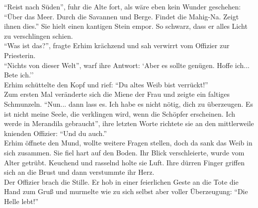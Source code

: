 ``Reist nach Süden'', fuhr die Alte fort, als wäre eben kein Wunder geschehen: ``Über das Meer. 
Durch die Savannen und Berge. Findet die Mahig-Na. Zeigt ihnen dies.'' Sie hielt einen kantigen 
Stein empor. So schwarz, dass er alles Licht zu verschlingen schien.\\
``Was ist das?'', fragte Erhim krächzend und sah verwirrt vom Offizier zur Priesterin.\\
``Nichts von dieser Welt'', warf ihre Antwort: `Aber es sollte genügen. Hoffe ich... Bete ich.''\\
Erhim schüttelte den Kopf und rief: ``Du altes Weib bist verrückt!''\\
Zum ersten Mal veränderte sich die Miene der Frau und zeigte ein faltiges Schmunzeln. ``Nun... 
dann lass es. Ich habe es nicht nötig, dich zu überzeugen. Es ist nicht meine Seele, die 
verklingen wird, wenn die Schöpfer erscheinen. Ich werde in Merandila gebraucht'', ihre letzten 
Worte richtete sie an den mittlerweile knienden Offizier: ``Und du auch.''\\
Erhim öffnete den Mund, wollte weitere Fragen stellen, doch da sank das Weib in sich zusammen. Sie 
fiel hart auf den Boden. Ihr Blick verschleierte, wurde vom Alter getrübt. Keuchend und rasselnd 
holte sie Luft. Ihre dürren Finger griffen sich an die Brust und dann verstummte ihr Herz.\\
Der Offizier brach die Stille. Er hob in einer feierlichen Geste an die Tote die Hand zum Gruß und 
murmelte wie zu sich selbst aber voller Überzeugung: ``Die Helle lebt!''\\







